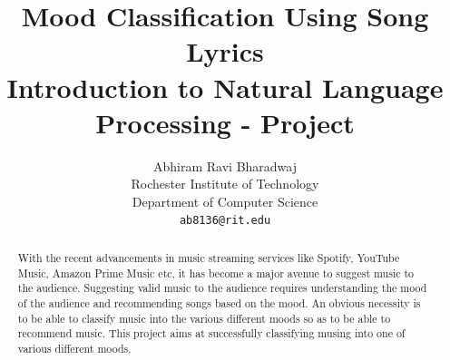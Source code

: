 \documentclass[11pt,a4paper]{article}
\title{
  Mood Classification Using Song Lyrics\\
  Introduction to Natural Language Processing - Project
}
\author{Abhiram Ravi Bharadwaj \\
  Rochester Institute of Technology \\
  Department of Computer Science \\
  \texttt{ab8136@rit.edu} \\}
\date{}
\begin{document}
\maketitle
\begin{abstract}
  With the recent advancements in music streaming services like Spotify, YouTube Music, Amazon Prime Music etc, it has become a major avenue to suggest music to the audience. Suggesting valid music to the audience requires understanding the mood of the audience and recommending songs based on the mood. An obvious necessity is to be able to classify music into the various different moods so as to be able to recommend music. This project aims at successfully classifying musing into one of various different moods.\\

\end{abstract}
\end{document}
